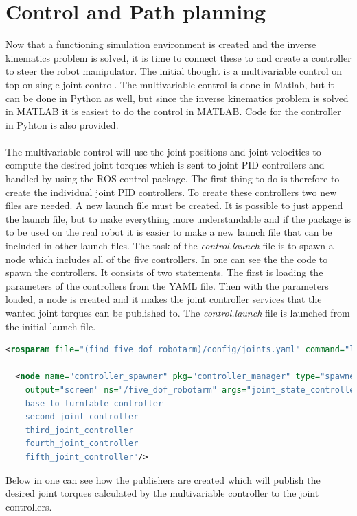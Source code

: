 \chapter{Control and Path planning}
Now that a functioning simulation environment is created and the inverse kinematics problem is solved, it is time to connect these to and create a controller to steer the robot manipulator. The initial thought is a multivariable control on top on single joint control. The multivariable control is done in Matlab, but it can be done in Python as well, but since the inverse kinematics problem is solved in MATLAB it is easiest to do the control in MATLAB. Code for the controller in Pyhton is also provided. \\\\
The multivariable control will use the joint positions and joint velocities to compute the desired joint torques which is sent to joint PID controllers and handled by using the ROS control package\cite{ROScontrol}. The first thing to do is therefore to create the individual joint PID controllers. To create these controllers two new files are needed. A new launch file must be created. It is possible to just append the launch file, but to make everything more understandable and if the package is to be used on the real robot it is easier to make a new launch file that can be included in other launch files. The task of the \textit{control.launch} file is to spawn a node which includes all of the five controllers. In  one can see the the code to spawn the controllers. It consists of two statements. The first is loading the parameters of the controllers from the YAML file. Then with the parameters loaded, a node is created and it makes the joint controller services that the wanted joint torques can be published to. The \textit{control.launch} file is launched from the initial launch file.
\begin{lstlisting}[language=xml,caption={Spawns the controller node},label={lst:launchControl}]
<rosparam file="(find five_dof_robotarm)/config/joints.yaml" command="load"/>

  <node name="controller_spawner" pkg="controller_manager" type="spawner" respawn="false"
	output="screen" ns="/five_dof_robotarm" args="joint_state_controller
    base_to_turntable_controller
    second_joint_controller
    third_joint_controller
    fourth_joint_controller
    fifth_joint_controller"/>
\end{lstlisting}
Below in  one can see how the publishers are created which will publish the desired joint torques calculated by the multivariable controller to the joint controllers.
